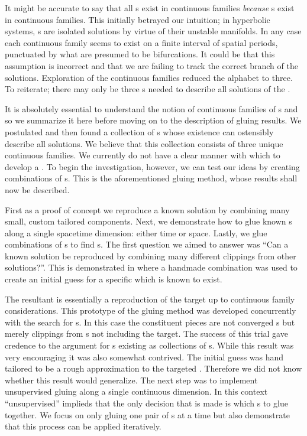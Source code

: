 It might be accurate to say that all {\po}s
exist in continuous families \emph{because} {\fpo}s exist in
continuous families. This initially betrayed our intuition; in hyperbolic systems, {\po}s are
isolated solutions by virtue of their unstable manifolds. In any case each continuous
family seems to exist on a finite interval of spatial periods, punctuated by what are
presumed to be bifurcations. It could be that this assumption is incorrect and that we
are failing to track the correct branch of the solutions.
Exploration of the {\fpo} continuous families reduced the alphabet
to three. To reiterate; there may only be three {\fpo}s
needed to describe all solutions of the {\KSe}.

It is absolutely essential to understand the notion of continuous families of {\fpo}s
and so we summarize it here before moving on to the description of gluing results. We postulated
and then found a collection of {\fpo}s whose existence can ostensibly describe all solutions.
We believe that this collection consists of three unique {\fpo} continuous families.
We currently do not have a clear manner with which to develop a {\spt} {\symbolic}.
To begin the investigation, however, we can test our ideas by creating
{\spt} combinations of {\fpo}s. This is the aforementioned gluing method,
whose results shall now be described.


First as a proof of concept we reproduce a known solution by combining many small,
custom tailored components. Next, we demonstrate how to glue known {\po}s along a single spacetime dimension: either time or space.
Lastly, we glue {\spt} combinations of {\fpo}s to find {\po}s.
The first question we aimed to answer was ``Can a known solution be reproduced by combining many different clippings from
other solutions?''.  This is demonstrated in %
where a handmade {\spt} combination was used to create an initial guess for a specific {\po} which
is known to exist.

The resultant {\po} is essentially a reproduction of the target up to continuous family considerations. This prototype of the gluing method was developed concurrently with the search
for {\fpo}s. In this case the constituent pieces are not converged {\fpo}s but merely clippings from {\po}s not including the target. The success of this trial gave credence to the argument for {\po}s
existing as collections of {\fpo}s.
While this result was very encouraging it was also somewhat contrived.
The initial guess was hand tailored to be a rough approximation to the
targeted {\po}. Therefore we did not know whether this result would generalize.
The next step was to implement unsupervised gluing along a single continuous dimension.
In this context ``unsupervised'' implieds that the only decision
that is made is which {\po}s to glue together.
We focus on only gluing one pair of {\po}s at a time but also demonstrate
that this process can be applied iteratively.

